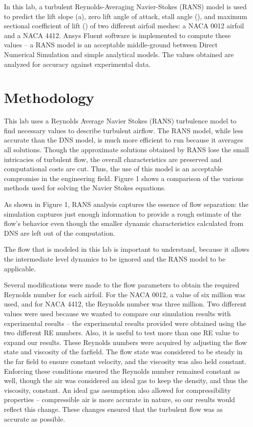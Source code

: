 \documentclass[]{aiaa-tc}%
\begin{document}
In this lab, a turbulent Reynolds-Averaging Navier-Stokes (RANS) model is used to
predict the lift slope (a), zero lift angle of attack, stall angle (), and maximum sectional
coefficient of lift () of two different airfoil meshes: a NACA 0012 airfoil and a NACA 4412.
Ansys Fluent software is implemented to compute these values – a RANS model is an acceptable
middle-ground between Direct Numerical Simulation and simple analytical models. The values
obtained are analyzed for accuracy against experimental data.


\section{Methodology}
This lab uses a Reynolds Average Navier Stokes (RANS) turbulence model to find necessary
values to describe turbulent airflow. The RANS model, while less accurate than the DNS model,
is much more efficient to run because it averages all solutions. Though the approximate solutions
obtained by RANS lose the small intricacies of turbulent flow, the overall characteristics are
preserved and computational costs are cut. Thus, the use of this model is an acceptable
compromise in the engineering field. Figure 1 shows a comparison of the various methods used
for solving the Navier Stokes equations.



As shown in Figure 1, RANS analysis captures the essence of flow separation: the simulation
captures just enough information to provide a rough estimate of the flow’s behavior even though
the smaller dynamic characteristics calculated from DNS are left out of the computation.

The flow that is modeled in this lab is important to understand, because it allows the
intermediate level dynamics to be ignored and the RANS model to be applicable.

Several modifications were made to the flow parameters to obtain the required Reynolds
number for each airfoil. For the NACA 0012, a value of six million was used, and for NACA
4412, the Reynolds number was three million. Two different values were used because we
wanted to compare our simulation results with experimental results – the experimental results
provided were obtained using the two different RE numbers. Also, it is useful to test more than
one RE value to expand our results. These Reynolds numbers were acquired by adjusting the
flow state and viscosity of the farfield. The flow state was considered to be steady in the far field
to ensure constant velocity, and the viscosity was also held constant. Enforcing these conditions
ensured the Reynolds number remained constant as well, though the air was considered an ideal
gas to keep the density, and thus the viscosity, constant. An ideal gas assumption also allowed
for compressibility properties – compressible air is more accurate in nature, so our results would
reflect this change. These changes ensured that the turbulent flow was as accurate as possible.
\end{document}
